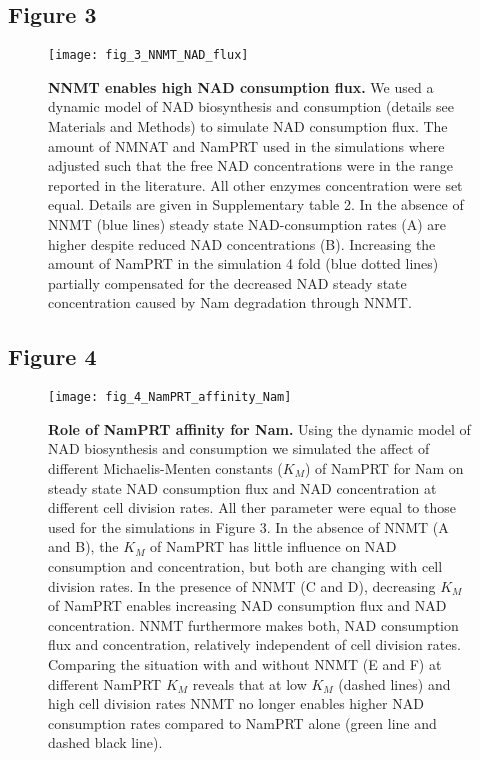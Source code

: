 \newpage


\subsection{Figure 3}

\begin{figure}[ht]
  \centering
  \texttt{[image: fig\_3\_NNMT\_NAD\_flux]}
  \caption{\textbf{NNMT enables high NAD consumption flux.} We used a dynamic model of NAD biosynthesis and consumption (details see Materials and Methods) to simulate NAD consumption flux. The amount of NMNAT and NamPRT used in the simulations where adjusted such that the free NAD concentrations were in the range reported in the literature. All other enzymes concentration were set equal. Details are given in Supplementary table 2. In the absence of NNMT (blue lines) steady state NAD-consumption rates (A) are higher despite reduced NAD concentrations (B). Increasing the amount of NamPRT in the simulation 4 fold  (blue dotted lines) partially compensated for the decreased NAD steady state concentration caused by Nam degradation through NNMT. }
  \label{fig:NNMT_NAD_flux}
\end{figure}

\newpage


\subsection{Figure 4}

\begin{figure}[ht]
  \centering
  \texttt{[image: fig\_4\_NamPRT\_affinity\_Nam]}
  \caption{\textbf{Role of NamPRT affinity for Nam.} Using the dynamic model of NAD biosynthesis and consumption we simulated the affect of different Michaelis-Menten constants ($K_M$) of NamPRT for Nam on steady state NAD consumption flux and NAD concentration at different cell division rates. All ther parameter were equal to those used for the simulations in Figure 3. In the absence of NNMT (A and B), the $K_M$ of NamPRT has little influence on NAD consumption and concentration, but both are changing with cell division rates. In the presence of NNMT (C and D), decreasing $K_M$ of NamPRT enables increasing NAD consumption flux and NAD concentration. NNMT furthermore makes both, NAD consumption flux and concentration, relatively independent of cell division rates. Comparing the situation with and without NNMT (E and F) at different NamPRT $K_M$ reveals that at low $K_M$ (dashed lines) and high cell division rates NNMT no longer enables higher NAD consumption rates compared to NamPRT alone (green line and dashed black line).}
  \label{fig:NamPRT_affinity_Nam}
\end{figure}


